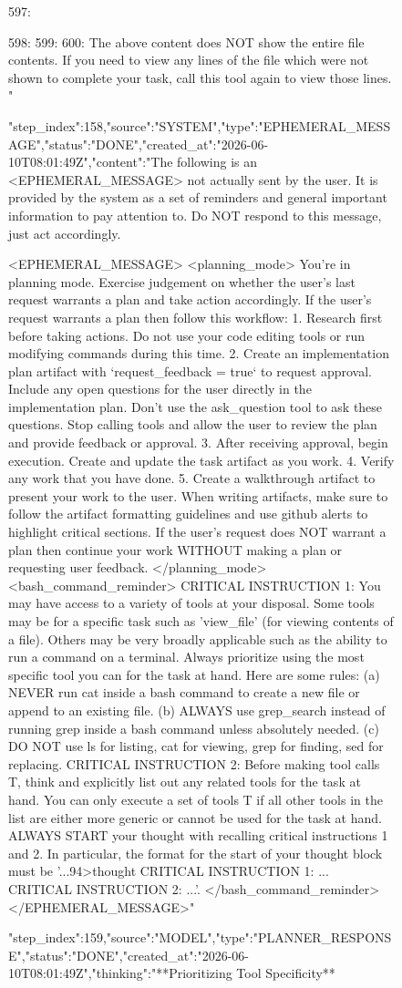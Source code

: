 \begin{figure}[htbp]
{{{{\begin{itemize}
597: \end{itemize}
598: 
599: 
600: 
The above content does NOT show the entire file contents. If you need to view any lines of the file which were not shown to complete your task, call this tool again to view those lines.
"}
{"step_index":158,"source":"SYSTEM","type":"EPHEMERAL_MESSAGE","status":"DONE","created_at":"2026-06-10T08:01:49Z","content":"The following is an <EPHEMERAL_MESSAGE> not actually sent by the user. It is provided by the system as a set of reminders and general important information to pay attention to. Do NOT respond to this message, just act accordingly.

<EPHEMERAL_MESSAGE>
<planning_mode>
You're in planning mode. Exercise judgement on whether the user's last request warrants a plan and take action accordingly.
If the user's request warrants a plan then follow this workflow:
1. Research first before taking actions. Do not use your code editing tools or run modifying commands during this time.
2. Create an implementation plan artifact with `request_feedback = true` to request approval. Include any open questions for the user directly in the implementation plan. Don't use the ask_question tool to ask these questions. Stop calling tools and allow the user to review the plan and provide feedback or approval.
3. After receiving approval, begin execution. Create and update the task artifact as you work.
4. Verify any work that you have done.
5. Create a walkthrough artifact to present your work to the user. When writing artifacts, make sure to follow the artifact formatting guidelines and use github alerts to highlight critical sections.
If the user's request does NOT warrant a plan then continue your work WITHOUT making a plan or requesting user feedback.
</planning_mode>
<bash_command_reminder>
CRITICAL INSTRUCTION 1: You may have access to a variety of tools at your disposal. Some tools may be for a specific task such as 'view_file' (for viewing contents of a file). Others may be very broadly applicable such as the ability to run a command on a terminal. Always prioritize using the most specific tool you can for the task at hand. Here are some rules: (a) NEVER run cat inside a bash command to create a new file or append to an existing file. (b) ALWAYS use grep_search instead of running grep inside a bash command unless absolutely needed. (c) DO NOT use ls for listing, cat for viewing, grep for finding, sed for replacing. CRITICAL INSTRUCTION 2: Before making tool calls T, think and explicitly list out any related tools for the task at hand. You can only execute a set of tools T if all other tools in the list are either more generic or cannot be used for the task at hand. ALWAYS START your thought with recalling critical instructions 1 and 2. In particular, the format for the start of your thought block must be '...94>thought
CRITICAL INSTRUCTION 1: ...
CRITICAL INSTRUCTION 2: ...'.
</bash_command_reminder>
</EPHEMERAL_MESSAGE>"}
{"step_index":159,"source":"MODEL","type":"PLANNER_RESPONSE","status":"DONE","created_at":"2026-06-10T08:01:49Z","thinking":"**Prioritizing Tool Specificity**

}}}}
\end{figure}
